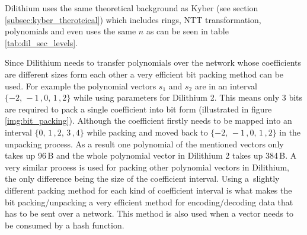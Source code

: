 Dilithium uses the same theoretical background as Kyber (see section \ref{subsec:kyber_theroteical}) which includes rings, NTT transformation, polynomials and even uses the same $n$ as can be seen in table \ref{tab:dil_sec_levels}.


Since Dilithium needs to transfer polynomials over the network whose coefficients are different sizes form each other a very efficient bit packing method can be used. For example the polynomial vectors $s_1$ and $s_2$ are in an interval $\{-2,\,-1\,,0,\,1\,,2\}$ while using parameters for Dilithium 2. This means only 3 bits are required to pack a single coefficient into bit form (illustrated in figure \ref{img:bit_packing}). Although the coefficient firstly needs to be mapped into an interval $\{0,\,1\,,2,\,3\,,4\}$ while packing and moved back to $\{-2,\,-1\,,0,\,1\,,2\}$ in the unpacking process. As a result one polynomial of the mentioned vectors only takes up 96\,B and the whole polynomial vector in Dilithium 2 takes up 384\,B. A very similar process is used for packing other polynomial vectors in Dilithium, the only difference being the size of the coefficient interval. Using a~slightly different packing method for each kind of coefficient interval is what makes the bit packing/unpacking a very efficient method for encoding/decoding data that has to be sent over a network. This method is also used when a vector needs to be consumed by a hash function.
